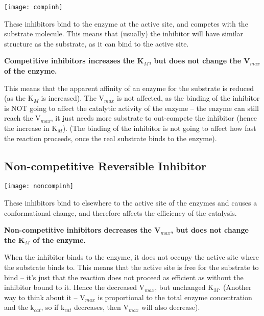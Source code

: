 \documentclass[a4paper, 12pt]{report}
\begin{document}
\begin{center}
\texttt{[image: compinh]}
\end{center}

These inhibitors bind to the enzyme at the active site, and competes with the substrate molecule.
This means that (usually) the inhibitor will have similar structure as the substrate, as it can bind to the active site.

\begin{center}
\textbf{Competitive inhibitors increases the K$_M$, but does not change the V$_{max}$ of the enzyme.}
\end{center}

This means that the apparent affinity of an enzyme for the substrate is reduced (as the K$_M$ is increased).
The V$_{max}$ is not affected, as the binding of the inhibitor is NOT going to affect the catalytic activity of the enzyme -- the enzyme can still reach the V$_{max}$, it just needs more substrate to out-compete the inhibitor (hence the increase in K$_M$).
(The binding of the inhibitor is not going to affect how fast the reaction proceeds, once the real substrate binds to the enzyme).

\subsection{Non-competitive Reversible Inhibitor}

\begin{center}
\texttt{[image: noncompinh]}
\end{center}

These inhibitors bind to elsewhere to the active site of the enzymes and causes a conformational change, and therefore affects the efficiency of the catalysis.

\begin{center}
\textbf{Non-competitive inhibitors decreases the V$_{max}$, but does not change the K$_M$ of the enzyme.}
\end{center}

When the inhibitor binds to the enzyme, it does not occupy the active site where the substrate binds to.
This means that the active site is free for the substrate to bind -- it's just that the reaction does not proceed as efficient as without the inhibitor bound to it.
Hence the decreased V$_{max}$, but unchanged K$_M$.
(Another way to think about it -- V$_{max}$ is proportional to the total enzyme concentration and the k$_{cat}$, so if k$_{cat}$ decreases, then V$_{max}$ will also decrease).
\end{document}
